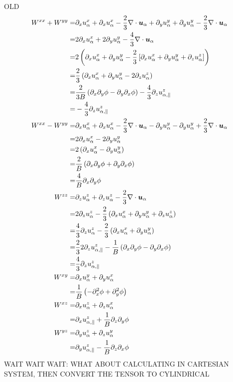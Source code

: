 OLD
\begin{align*}
W^{xx} + W^{yy}
=&
\partial_x u^{x}_{\a}
+ \partial_x u^{x}_{\a}
- \frac{2}{3} \div \ve{u}_{\a}
+ \partial_y u^{y}_{\a}
+ \partial_y u^{y}_{\a}
- \frac{2}{3} \div \ve{u}_{\a}
\\
%
=&
2\partial_x u^{x}_{\a}
+ 2\partial_y u^{y}_{\a}
- \frac{4}{3} \div \ve{u}_{\a}
\\
%
=&
2\L(\partial_x u^{x}_{\a}
    + \partial_y u^{y}_{\a}
    - \frac{2}{3} \L[\partial_x u^{x}_{\a}
          +\partial_y u^{y}_{\a}
          +\partial_z u^{z}_{\a}
                      \R]
\R)
\\
%
=&
\frac{2}{3}\L(\partial_x u^{x}_{\a}
          + \partial_y u^{y}_{\a}
          - 2\partial_z u^{z}_{\a}
\R)
\\
%
=&
\frac{2}{3B}
\L(\partial_x \partial_y \phi
- \partial_y \partial_x \phi
\R)
-
\frac{4}{3}
 \partial_z u^{z}_{\a,\|}
\\
%
=&
-
\frac{4}{3}
\partial_z u^{z}_{\a,\|}
\\
%
%
%
W^{xx} - W^{yy}
=&
\partial_x u^{x}_{\a}
+ \partial_x u^{x}_{\a}
- \frac{2}{3} \div \ve{u}_{\a}
- \partial_y u^{y}_{\a}
- \partial_y u^{y}_{\a}
+ \frac{2}{3} \div \ve{u}_{\a}
\\
%
=&
2\partial_x u^{x}_{\a} -2 \partial_y u^{y}_{\a}
\\
%
=&
2\L(\partial_x u^{x}_{\a} - \partial_y u^{y}_{\a} \R)
%
\\
=&
\frac{2}{B}
\L(\partial_x \partial_y \phi + \partial_y \partial_x \phi \R)
%
\\
=&
\frac{4}{B} \partial_x \partial_y \phi
\\
%
%
%
%
W^{zz}
=&
\partial_z u^{z}_{\a} + \partial_z u^{z}_{\a} - \frac{2}{3} \div \ve{u}_{\a}
\\
%
=&
2\partial_z u^{z}_{\a} - \frac{2}{3}
    \L(\partial_x u^{x}_{\a}
       +\partial_y u^{y}_{\a}
       +\partial_z u^{z}_{\a}
    \R)
\\
%
=&
\frac{4}{3} \partial_z u^{z}_{\a} - \frac{2}{3}
    \L(\partial_x u^{x}_{\a}
       +\partial_y u^{y}_{\a}
    \R)
\\
%
=&
\frac{2}{3}
2 \partial_z u^{z}_{\a,\|} -
    \frac{1}{B}
    \L(\partial_x \partial_y \phi
       - \partial_y \partial_x \phi
    \R)
\\
%
=& \frac{4}{3} \partial_z u^{z}_{\a,\|}
\\
%
%
%
%
W^{xy}
=&
\partial_x u^{y}_{\a} + \partial_y u^{x}_{\a}
\\
%
=&
\frac{1}{B}\L( - \partial_x^2 \phi + \partial_y^2 \phi \R)
\\
%
%
%
%
W^{xz}
=&
\partial_x u^{z}_{\a} + \partial_z u^{x}_{\a}
%
\\
=&
\partial_x u^{z}_{\a, \|} + \frac{1}{B}\partial_z \partial_y \phi
\\
%
%
%
%
W^{yz}
=&
\partial_y u^{z}_{\a} + \partial_z u^{y}_{\a}
%
\\
=&
\partial_y u^{z}_{\a,\|} - \frac{1}{B} \partial_z \partial_x \phi
\end{align*}
%
WAIT WAIT WAIT: WHAT ABOUT CALCULATING IN CARTESIAN SYSTEM, THEN CONVERT THE
TENSOR TO CYLINDRICAL

